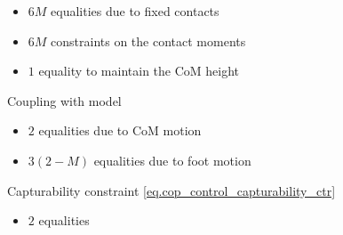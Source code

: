\begin{hierarchy}
\begin{itemize}
                \item
                    $6 M$ equalities due to fixed contacts

                \item
                    $6 M$ constraints on the contact moments

                \item
                    $1$ equality to maintain the \acs{CoM} height
            \end{itemize}

            Coupling with  model
            \begin{itemize}%
                \item
                    $2$ equalities due to \acs{CoM} motion

                \item
                    $3(2-M)$ equalities due to foot motion
            \end{itemize}

    \level Capturability constraint \cref{eq.cop_control_capturability_ctr}
            \begin{itemize}%
                \item
                    $2$ equalities
            \end{itemize}


\end{hierarchy}
